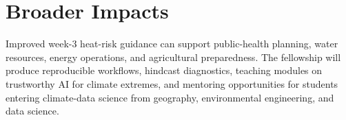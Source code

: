 \documentclass[11pt,letterpaper]{article}
\begin{document}
\section*{Broader Impacts}
Improved week-3 heat-risk guidance can support public-health planning, water resources, energy operations, and agricultural preparedness. The fellowship will produce reproducible workflows, hindcast diagnostics, teaching modules on trustworthy AI for climate extremes, and mentoring opportunities for students entering climate-data science from geography, environmental engineering, and data science.
\end{document}
